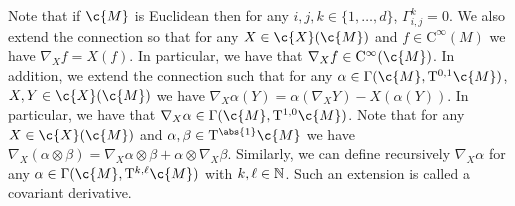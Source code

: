 Note that if \(\c{M}\) is Euclidean then for any \(i,j,k \in \{1, \dots, d\}\), \(\Gamma_{i,j}^k = 0\).
We also extend the connection so that for any \(X \in \c{X}(\c{M})\) and \(f \in \mathrm{C}^\infty(M)\) we have \(\nabla_X f = X(f)\).
In particular, we have that \(\nabla_X f \in \mathrm{C}^\infty(\c{M})\).
In addition, we extend the connection such that for any \(\alpha \in \Gamma(\c{M}, \mathrm{T}^{0,1} \c{M})\), \(X,Y \in \c{X}(\c{M})\) we have \(\nabla_X \alpha (Y) = \alpha(\nabla_X Y) - X(\alpha(Y))\).
In particular, we have that \(\nabla_X \alpha \in \Gamma(\c{M}, \mathrm{T}^{1,0} \c{M})\).
Note that for any \(X \in \c{X}(\c{M})\) and \(\alpha, \beta \in \mathrm{T}^{\abs{1}} \c{M}\) we have \(\nabla_X (\alpha \otimes \beta) = \nabla_X \alpha \otimes \beta + \alpha \otimes \nabla_X \beta\).
Similarly, we can define recursively \(\nabla_X \alpha\) for any \(\alpha \in \Gamma(\c{M}, \mathrm{T}^{k,\ell}\c{M})\) with \(k, \ell \in \mathbb{N}\).
Such an extension is called a covariant derivative.

